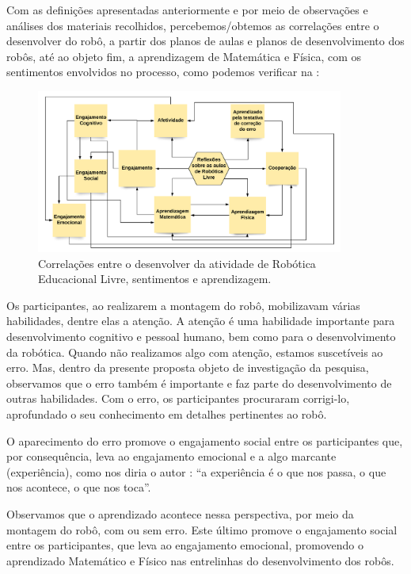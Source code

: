 \documentclass{textolivre}
\begin{document}
Com as definições apresentadas anteriormente e por meio de observações e análises dos materiais recolhidos, percebemos/obtemos as correlações entre o desenvolver do robô, a partir dos planos de aulas e planos de desenvolvimento dos robôs, até ao objeto fim, a aprendizagem de Matemática e Física, com os sentimentos envolvidos no processo, como podemos verificar na :

\begin{figure}[htbp]
 \centering
 \includegraphics[width=0.9\textwidth]{fig-017.png}
 \caption{Correlações entre o desenvolver da atividade de Robótica Educacional Livre, sentimentos e aprendizagem.}
 \label{fig17}
\end{figure}

Os participantes, ao realizarem a montagem do robô, mobilizavam várias habilidades, dentre elas a atenção. A atenção é uma habilidade importante para desenvolvimento cognitivo e pessoal humano, bem como para o desenvolvimento da robótica. Quando não realizamos algo com atenção, estamos suscetíveis ao erro. Mas, dentro da presente proposta objeto de investigação da pesquisa, observamos que o erro também é importante e faz parte do desenvolvimento de outras habilidades. Com o erro, os participantes procuraram corrigi-lo, aprofundado o seu conhecimento em detalhes pertinentes ao robô. 

O aparecimento do erro promove o engajamento social entre os participantes que, por consequência, leva ao engajamento emocional e a algo marcante (experiência), como nos diria o autor \textcite[p. 21]{larrosa2002}: “a experiência é o que nos passa, o que nos acontece, o que nos toca”.

Observamos que o aprendizado acontece nessa perspectiva, por meio da montagem do robô, com ou sem erro. Este último promove o engajamento social entre os participantes, que leva ao engajamento emocional, promovendo o aprendizado Matemático e Físico nas entrelinhas do desenvolvimento dos robôs. 
\end{document}
